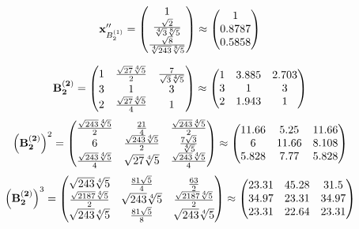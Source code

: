 \documentclass[10pt,a4paper]{article}
\begin{document}
	\[
		\bold{x}''_{B_2^{(1)}} = 
		\begin{pmatrix}
			{1} {} \\
			\frac{\sqrt{2}} {\sqrt[4]{3}\sqrt[8]{5}} \\
			\frac{\sqrt{8}} {\sqrt[4]{243}\sqrt[8]{5}} \\
		\end{pmatrix}
		\approx
		\begin{pmatrix}
			1        \\
			0.8787   \\
			0.5858   \\
		\end{pmatrix}
	\]

	\[
		\bold{B_2^{(2)}} = 
		\begin{pmatrix}
			{1} {} & \frac{\sqrt{27}\sqrt[4]{5}} {{2}} & \frac{{7}} {\sqrt{3}\sqrt[4]{5}} \\
			{{3}} {} & {1} {} & {{3}} {} \\
			{{2}} {} & \frac{\sqrt{27}\sqrt[4]{5}} {{4}} & {1} {} \\
		\end{pmatrix}
		\approx
		\begin{pmatrix}
			1        & 3.885    & 2.703    \\
			3        & 1        & 3        \\
			2        & 1.943    & 1        \\
		\end{pmatrix}
	\]
	\[
		\left(\bold{B_2^{(2)}}\right)^{2} = 
		\begin{pmatrix}
			\frac{\sqrt{243}\sqrt[4]{5}} {{2}} & \frac{{21}} {{4}} & \frac{\sqrt{243}\sqrt[4]{5}} {{2}} \\
			{{6}} {} & \frac{\sqrt{243}\sqrt[4]{5}} {{2}} & \frac{{7}\sqrt{3}} {\sqrt[4]{5}} \\
			\frac{\sqrt{243}\sqrt[4]{5}} {{4}} & {\sqrt{27}\sqrt[4]{5}} {} & \frac{\sqrt{243}\sqrt[4]{5}} {{4}} \\
		\end{pmatrix}
		\approx
		\begin{pmatrix}
			11.66    & 5.25     & 11.66    \\
			6        & 11.66    & 8.108    \\
			5.828    & 7.77     & 5.828    \\
		\end{pmatrix}
	\]
	\[
		\left(\bold{B_2^{(2)}}\right)^{3} = 
		\begin{pmatrix}
			{\sqrt{243}\sqrt[4]{5}} {} & \frac{{81}\sqrt{5}} {{4}} & \frac{{63}} {{2}} \\
			\frac{\sqrt{2187}\sqrt[4]{5}} {{2}} & {\sqrt{243}\sqrt[4]{5}} {} & \frac{\sqrt{2187}\sqrt[4]{5}} {{2}} \\
			{\sqrt{243}\sqrt[4]{5}} {} & \frac{{81}\sqrt{5}} {{8}} & {\sqrt{243}\sqrt[4]{5}} {} \\
		\end{pmatrix}
		\approx
		\begin{pmatrix}
			23.31    & 45.28    & 31.5     \\
			34.97    & 23.31    & 34.97    \\
			23.31    & 22.64    & 23.31    \\
		\end{pmatrix}
	\]
\end{document}

